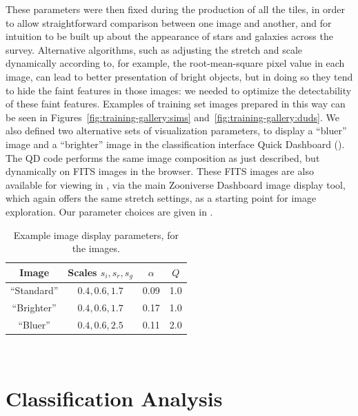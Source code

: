 \documentclass[useAMS,usenatbib,a4paper]{mn2e}
\begin{document}
These parameters were then fixed during the production of all the tiles, in
order to allow straightforward comparison between one image and another, and
for intuition to be built up about the appearance of stars and galaxies across
the survey. Alternative algorithms, such as adjusting the stretch and scale
dynamically according to, for example, the root-mean-square pixel value in
each image, can lead to better presentation of bright objects, but in doing so
they tend to hide the faint features in those images: we needed to optimize
the detectability of these faint features.   Examples of \cfhtls training set
images prepared in this way can be seen in Figures~\ref{fig:training-gallery:sims}
and~\ref{fig:training-gallery:duds}. We also defined two alternative sets of
visualization parameters, to display a ``bluer'' image and a ``brighter''
image in the classification interface Quick Dashboard
(). The QD code performs the same image composition
as just described, but dynamically on FITS images in the browser. These FITS
images are also available for viewing in \Talk, via the main Zooniverse
Dashboard image display tool, which again offers the same stretch settings, as
a starting point for image exploration. Our parameter choices are given in
.

\begin{table}
\begin{center}
\caption{Example \humvi image display parameters, for the \cfhtls images.}
\label{tab:data:humvi}
\begin{tabular}{cccc}
  \hline
  \hline {Image} & Scales ${s_i,s_r,s_g}$ & $\alpha$ & $Q$ \\
  \hline
    ``Standard'' &    ${0.4,0.6,1.7}$     &   0.09   & 1.0 \\
    ``Brighter'' &    ${0.4,0.6,1.7}$     &   0.17   & 1.0 \\
       ``Bluer'' &    ${0.4,0.6,2.5}$     &   0.11   & 2.0 \\
  \hline \hline
\end{tabular}
\medskip\\
\end{center}
\end{table}


\section{Classification Analysis}
\label{sec:swap}
\end{document}
